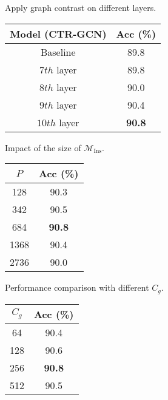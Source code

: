 \documentclass{article} \usepackage{iclr2023_conference,times}
\begin{document}
\begin{minipage}{\textwidth}
\begin{minipage}[t]{0.3\textwidth}
\centering
\setlength\tabcolsep{2pt}
\makeatletter{}
\setlength\tabcolsep{2.5pt}
   \scriptsize
   \caption{Apply graph contrast on different layers.}
    \begin{tabular}{c||c}
       \rowcolor{gray!30} Model (CTR-GCN) & Acc (\%) \\
       \hline \hline
       Baseline & 89.8 \\\hline
       $7th$ layer & 89.8 \\
       $8th$ layer & 90.0 \\
       $9th$ layer & 90.4 \\
       $10th$ layer & \textbf{90.8} \\
       \hline
    \end{tabular}
    \label{table:different layer to contrast}
\end{minipage}
\hspace{3mm}
\begin{minipage}[t]{0.3\textwidth}
\centering
\makeatletter{}
\setlength\tabcolsep{2.5pt}
\scriptsize
\caption{Impact of the size of $\mathcal{M}_\text{Ins}$.}
    \begin{tabular}{c||c}
\rowcolor{gray!30} $P$ & Acc (\%) \\
       \hline \hline
        128 & 90.3 \\
        342 & 90.5 \\
        684 & \textbf{90.8} \\
        1368 & 90.4 \\
        2736 & 90.0 \\\hline
    \end{tabular}
    \label{tab: capacity of instance memory bank.}
\end{minipage}
\hspace{3mm}
\begin{minipage}[t]{0.3\textwidth}
\centering
\makeatletter{}
\setlength\tabcolsep{2.5pt}
   \scriptsize
   \caption{Performance comparison with different $C_g$.}
    \begin{tabular}{c||c}
\rowcolor{gray!30} $C_g$ & Acc (\%) \\
       \hline \hline
        64 &	90.4 \\
        128 &	90.6 \\
        256 &	\textbf{90.8} \\ 
        512 &	90.5 \\\hline
    \end{tabular}
    \label{tab:C_g.}
\end{minipage}


\end{minipage}
\end{document}
